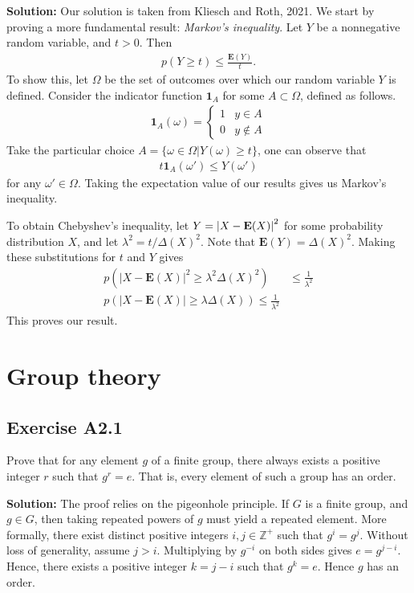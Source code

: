 \documentclass{book}
\begin{document}
    \textbf{Solution:} Our solution is taken from Kliesch and Roth, 2021. We start by proving  a more fundamental result: \emph{Markov's inequality}. Let $Y$ be a nonnegative random variable, and $t>0$. Then
    \begin{align}
        p(Y\geq t) \leq \frac{\textbf{E}(Y)}{t}.
    \end{align}
    To show this, let $\Omega$ be the set of outcomes over which our random variable $Y$ is defined. Consider the indicator function $\textbf{1}_A$ for some $A\subset\Omega$, defined as follows.
    \begin{align}
        \textbf{1}_A (\omega) = 
        \begin{cases}
            1 & y\in A \\
            0 & y \notin A
        \end{cases}
    \end{align}
    Take the particular choice $A = \{\omega\in \Omega| Y(\omega)\geq t\}$, one can observe that
    \begin{align}
        t \textbf{1}_A (\omega')\leq Y(\omega')
    \end{align}
    for any $\omega' \in \Omega$. Taking the expectation value of our results gives us Markov's inequality.
    
    To obtain Chebyshev's inequality, let $Y = \abs{X-\textbf{E}(X)}^2$ for some probability distribution $X$, and let $\lambda^2 = t/\Delta(X)^2$. Note that $\mathbf{E}(Y) = \Delta (X)^2$. Making these substitutions for $t$ and $Y$ gives
    \begin{align}
        p(|X-\mathbf{E}(X)|^2 \geq \lambda^2 \Delta(X)^2) &\leq \frac{1}{\lambda^2} \\
        p(|X-\mathbf{E}(X)|\geq \lambda\Delta(X)) \leq \frac{1}{\lambda^2}
    \end{align}
    This proves our result.


\chapter{Group theory}


\section*{Exercise A2.1}
    Prove that for any element $g$ of a finite group, there always exists a positive integer $r$ such that $g^r = e$. That is, every element of such a group has an order.
    
    \textbf{Solution:} The proof relies on the pigeonhole principle. If $G$ is a finite group, and $g\in G$, then taking repeated powers of $g$ must yield a repeated element. More formally, there exist distinct positive integers $i,j \in \mathbb{Z^+}$ such that $g^i = g^j$. Without loss of generality, assume $j>i$. Multiplying by $g^{-i}$ on both sides gives $e = g^{j-i}$. Hence, there exists a positive integer $k=j-i$ such that $g^k = e$. Hence $g$ has an order. 
    
\end{document}
